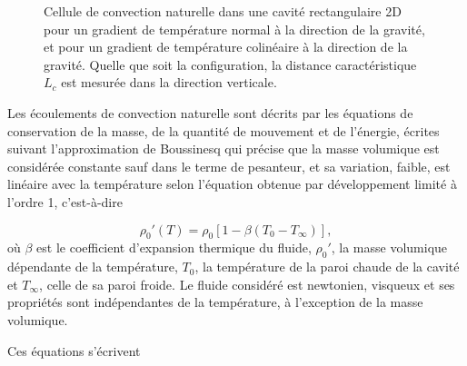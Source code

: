 \begin{figure}[!ht]
    \centering
	\begin{subfigure}[c]{.42\textwidth}
		\centering
    	
		\caption{}
		\label{fig:ConvNat2D_HorizDeltaT}
	\end{subfigure}	
	\begin{subfigure}[c]{.42\textwidth}
		\centering
    	
		\caption{}
		\label{fig:ConvNat2D_VertiDeltaT}
	\end{subfigure}	    
    \caption{Cellule de convection naturelle dans une cavité rectangulaire 2D  pour un gradient de température normal à la direction de la gravité, et  pour un gradient de température colinéaire à la direction de la gravité. Quelle que soit la configuration, la distance caractéristique $L_c$ est mesurée dans la direction verticale.}
    \label{fig:ConvNat2D}
\end{figure}



Les écoulements de convection naturelle sont décrits par les équations de conservation de la masse, de la quantité de mouvement et de l'énergie, écrites suivant l'approximation de Boussinesq qui précise que la masse volumique est considérée constante sauf dans le terme de pesanteur, et sa variation, faible, est linéaire avec la température selon l'équation obtenue par développement limité à l'ordre 1, c'est-à-dire

\begin{equation}
	\rho_0'(T) = \rho_0[1-\beta(T_0-T_\infty)],
	\label{eq:MasseVolumiqueBoussinesq}
\end{equation}
où $\beta$ est le coefficient d'expansion thermique du fluide, $\rho_{0}'$, la masse volumique dépendante de la température, $T_{0}$, la température de la paroi chaude de la cavité et $T_{\infty}$, celle de sa paroi froide. Le fluide considéré est newtonien, visqueux et ses propriétés sont indépendantes de la température, à l'exception de la masse volumique.\smallskip 

Ces équations s'écrivent

